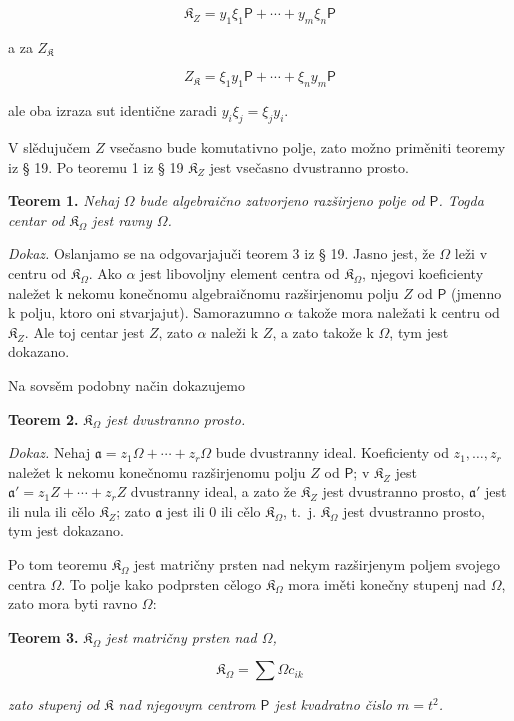 \documentclass[11pt]{article}
\begin{document}
\[
\mathfrak K_Z=y_1\xi_1\mathsf P+\cdots+y_m\xi_n\mathsf P
\]

a za \(Z_{\mathfrak K}\)

\[
Z_{\mathfrak K}=\xi_1y_1\mathsf P+\cdots+\xi_ny_m\mathsf P
\]

ale oba izraza sut identične zaradi \(y_i\xi_j=\xi_jy_i\).

V slědujučem \(Z\) vsečasno bude komutativno polje, zato možno priměniti teoremy iz § 19. Po teoremu 1 iz § 19 \(\mathfrak K_Z\) jest vsečasno dvustranno prosto.

\textbf{Teorem 1.} \emph{Nehaj \(\Omega\) bude algebraično zatvorjeno razširjeno polje od \(\mathsf P\). Togda centar od \(\mathfrak K_\Omega\) jest ravny \(\Omega\).}

\emph{Dokaz.} Oslanjamo se na odgovarjajuči teorem 3 iz § 19. Jasno jest, že \(\Omega\) leži v centru od \(\mathfrak K_\Omega\). Ako \(\alpha\) jest libovoljny element centra od \(\mathfrak K_\Omega\), njegovi koeficienty naležet k nekomu konečnomu algebraičnomu razširjenomu polju \(Z\) od \(\mathsf P\) (jmenno k polju, ktoro oni stvarjajut). Samorazumno \(\alpha\) takože mora naležati k centru od \(\mathfrak K_Z\). Ale toj centar jest \(Z\), zato \(\alpha\) naleži k \(Z\), a zato takože k \(\Omega\), tym jest dokazano.

Na sovsěm podobny način dokazujemo

\textbf{Teorem 2.} \emph{\(\mathfrak K_\Omega\) jest dvustranno prosto.}

\emph{Dokaz.} Nehaj \(\mathfrak a=z_1\Omega+\cdots+z_r\Omega\) bude dvustranny ideal. Koeficienty od \(z_1,\ldots,z_r\) naležet k nekomu konečnomu razširjenomu polju \(Z\) od \(\mathsf P\); v \(\mathfrak K_Z\) jest \(\mathfrak a'=z_1Z+\cdots+z_rZ\) dvustranny ideal, a zato že \(\mathfrak K_Z\) jest dvustranno prosto, \(\mathfrak a'\) jest ili nula ili cělo \(\mathfrak K_Z\); zato \(\mathfrak a\) jest ili 0 ili cělo \(\mathfrak K_\Omega\), t.~j. \(\mathfrak K_\Omega\) jest dvustranno prosto, tym jest dokazano.

Po tom teoremu \(\mathfrak K_\Omega\) jest matričny prsten nad nekym razširjenym poljem svojego centra \(\Omega\). To polje kako podprsten cělogo \(\mathfrak K_\Omega\) mora iměti konečny stupenj nad \(\Omega\), zato mora byti ravno \(\Omega\):

\textbf{Teorem 3.} \emph{\(\mathfrak K_\Omega\) jest matričny prsten nad \(\Omega\),}

\[
\mathfrak K_\Omega=\sum\Omega c_{ik}
\]

\emph{zato stupenj od \(\mathfrak K\) nad njegovym centrom \(\mathsf P\) jest kvadratno čislo \(m=t^2\).}
\end{document}
